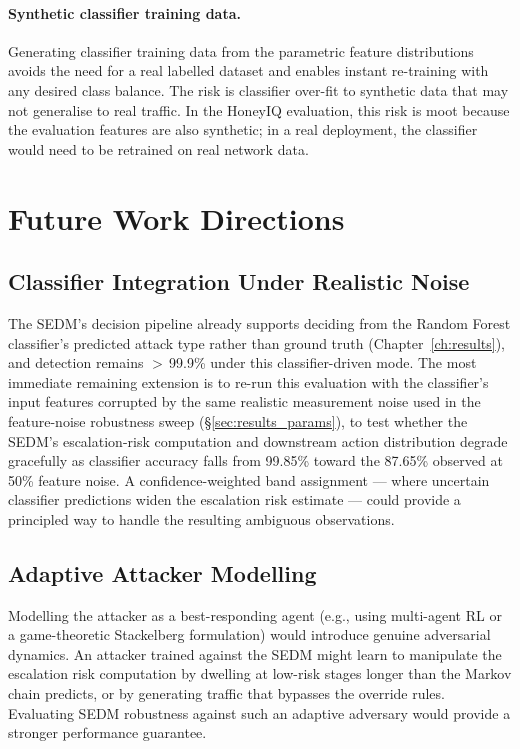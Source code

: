 \paragraph{Synthetic classifier training data.}
Generating classifier training data from the parametric feature distributions
avoids the need for a real labelled dataset and enables instant re-training
with any desired class balance.
The risk is classifier over-fit to synthetic data that may not generalise
to real traffic.
In the HoneyIQ evaluation, this risk is moot because the evaluation features
are also synthetic; in a real deployment, the classifier would need to be
retrained on real network data.

\section{Future Work Directions}
\label{sec:future}

\subsection{Classifier Integration Under Realistic Noise}
\label{sec:future_classifier}

The SEDM's decision pipeline already supports deciding from the Random
Forest classifier's predicted attack type rather than ground truth
(Chapter~\ref{ch:results}), and detection remains $>$\,99.9\% under this
classifier-driven mode.
The most immediate remaining extension is to re-run this evaluation with
the classifier's input features corrupted by the same realistic
measurement noise used in the feature-noise robustness sweep
(\S\ref{sec:results_params}), to test whether the SEDM's escalation-risk
computation and downstream action distribution degrade gracefully as
classifier accuracy falls from 99.85\% toward the 87.65\% observed at 50\%
feature noise.
A confidence-weighted band assignment --- where uncertain classifier
predictions widen the escalation risk estimate --- could provide a principled
way to handle the resulting ambiguous observations.

\subsection{Adaptive Attacker Modelling}

Modelling the attacker as a best-responding agent (e.g., using multi-agent
RL or a game-theoretic Stackelberg formulation) would introduce genuine
adversarial dynamics.
An attacker trained against the SEDM might learn to manipulate the
escalation risk computation by dwelling at low-risk stages longer than
the Markov chain predicts, or by generating traffic that bypasses the
override rules.
Evaluating SEDM robustness against such an adaptive adversary would provide
a stronger performance guarantee.

